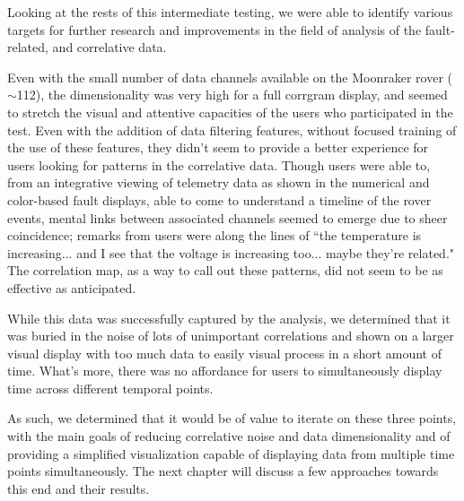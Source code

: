 Looking at the rests of this intermediate testing, we were able to identify various targets for further research and improvements in the field of analysis of the fault-related, and correlative data.

Even with the small number of data channels available on the Moonraker rover ($\sim$112), the dimensionality was very high for a full corrgram display, and seemed to stretch the visual and attentive capacities of the users who participated in the test. Even with the addition of data filtering features, without focused training of the use of these features, they didn't seem to provide a better experience for users looking for patterns in the correlative data. Though users were able to, from an integrative viewing of telemetry data as shown in the numerical and color-based fault displays, able to come to understand a timeline of the rover events, mental links between associated channels seemed to emerge due to sheer coincidence; remarks from users were along the lines of ``the temperature is increasing... and I see that the voltage is increasing too... maybe they're related." The correlation map, as a way to call out these patterns, did not seem to be as effective as anticipated.

While this data was successfully captured by the analysis, we determined that it was buried in the noise of lots of unimportant correlations and shown on a larger visual display with too much data to easily visual process in a short amount of time. What's more, there was no affordance for users to simultaneously display time across different temporal points.

As such, we determined that it would be of value to iterate on these three points, with the main goals of reducing correlative noise and data dimensionality and of providing a simplified visualization capable of displaying data from multiple time points simultaneously. The next chapter will discuss a few approaches towards this end and their results.
